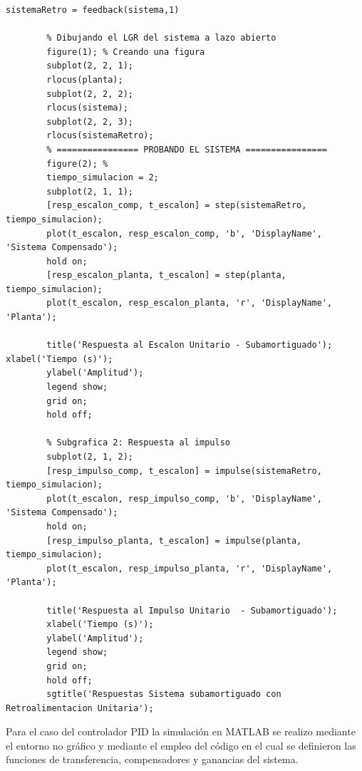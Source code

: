 \documentclass[conference]{IEEEtran}
\begin{document}
\begin{lstlisting}[numbers=none, caption={Controlador PD}]
		sistemaRetro = feedback(sistema,1)
		
		% Dibujando el LGR del sistema a lazo abierto
		figure(1); % Creando una figura
		subplot(2, 2, 1);
		rlocus(planta);
		subplot(2, 2, 2);
		rlocus(sistema);
		subplot(2, 2, 3);
		rlocus(sistemaRetro);
		% ================ PROBANDO EL SISTEMA ================
		figure(2); %
		tiempo_simulacion = 2;
		subplot(2, 1, 1);
		[resp_escalon_comp, t_escalon] = step(sistemaRetro, tiempo_simulacion);
		plot(t_escalon, resp_escalon_comp, 'b', 'DisplayName', 'Sistema Compensado');
		hold on;
		[resp_escalon_planta, t_escalon] = step(planta, tiempo_simulacion);
		plot(t_escalon, resp_escalon_planta, 'r', 'DisplayName', 'Planta');
		
		title('Respuesta al Escalon Unitario - Subamortiguado');		xlabel('Tiempo (s)');
		ylabel('Amplitud');
		legend show;
		grid on; 
		hold off;
		
		% Subgrafica 2: Respuesta al impulso 
		subplot(2, 1, 2); 
		[resp_impulso_comp, t_escalon] = impulse(sistemaRetro, tiempo_simulacion);
		plot(t_escalon, resp_impulso_comp, 'b', 'DisplayName', 'Sistema Compensado');
		hold on;
		[resp_impulso_planta, t_escalon] = impulse(planta, tiempo_simulacion);
		plot(t_escalon, resp_impulso_planta, 'r', 'DisplayName', 'Planta');
		
		title('Respuesta al Impulso Unitario  - Subamortiguado');
		xlabel('Tiempo (s)');
		ylabel('Amplitud'); 
		legend show;
		grid on; 
		hold off;
		sgtitle('Respuestas Sistema subamortiguado con Retroalimentacion Unitaria');
	\end{lstlisting}
	
	Para el caso del controlador PID la simulación en MATLAB se realizo mediante el entorno no gráfico y mediante el empleo del código en el cual se definieron las funciones de transferencia, compensadores y ganancias del sistema.
	
\end{document}

